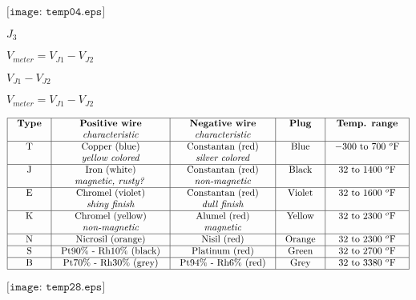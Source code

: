 \documentclass[12pt,a4paper,margin=2cm]{book}
\def\lthtmlcheckvsize{\ifdim\ht\sizebox<\vsize 
  \ifdim\wd\sizebox<\hsize\expandafter\hfill\fi \expandafter\vfill
  \else\expandafter\vss\fi}%
\begin{document}
{\newpage\clearpage
{}%
$\displaystyle \texttt{[image: temp04.eps]}$%
\lthtmlindisplaymathZ
\lthtmlcheckvsize\clearpage}

{\newpage\clearpage
{}%
$ J_3$%
\lthtmlindisplaymathZ
\lthtmlcheckvsize\clearpage}

{\newpage\clearpage
{}%
$\displaystyle V_{meter} = V_{J1} - V_{J2}$%
\lthtmlindisplaymathZ
\lthtmlcheckvsize\clearpage}

{\newpage\clearpage
{}%
$ V_{J1} - V_{J2}$%
\lthtmlindisplaymathZ
\lthtmlcheckvsize\clearpage}

{\newpage\clearpage
{}%
$ V_{meter} = V_{J1} - V_{J2}$%
\lthtmlindisplaymathZ
\lthtmlcheckvsize\clearpage}

{\newpage\clearpage
{}%
$\displaystyle \vbox{\offinterlineskip
\halign{\strut
\vrule \quad\hfil # \  \hfil & 
\vrule \quad\hfil # \  \hfil & 
\vrule \quad\hfil # \  \hfil & 
\vrule \quad\hfil # \  \hfil & 
\vrule \quad\hfil # \  \hfil \vrule \cr
\noalign{\hrule }
\textbf{Type} & \textbf{Positive wire} & \textbf{Negative wire} & \textbf{Plug} & \textbf{Temp. range} \cr
     & \textit{characteristic} & \textit{characteristic} &  & \cr
\noalign{\hrule }
T & Copper (blue) & Constantan (red) & Blue & $-300$ to 700 $^{o}$F \cr
  & \textit{yellow colored} & \textit{silver colored} &  &  \cr
\noalign{\hrule }
J & Iron (white) & Constantan (red) & Black & 32 to 1400 $^{o}$F \cr
  & \textit{magnetic, rusty?} & \textit{non-magnetic} &  &  \cr
\noalign{\hrule }
E & Chromel (violet) & Constantan (red) & Violet & 32 to 1600 $^{o}$F \cr
  & \textit{shiny finish} & \textit{dull finish} &  &  \cr
\noalign{\hrule }
K & Chromel (yellow) & Alumel (red) & Yellow & 32 to 2300 $^{o}$F \cr
  & \textit{non-magnetic} & \textit{magnetic} &  &  \cr
\noalign{\hrule }
N & Nicrosil (orange) & Nisil (red) & Orange & 32 to 2300 $^{o}$F \cr
\noalign{\hrule }
S & Pt90\% - Rh10\% (black) & Platinum (red) & Green & 32 to 2700 $^{o}$F \cr
\noalign{\hrule }
B & Pt70\% - Rh30\% (grey) & Pt94\% - Rh6\% (red) & Grey & 32 to 3380 $^{o}$F \cr
\noalign{\hrule }
} %
}$%
\lthtmlindisplaymathZ
\lthtmlcheckvsize\clearpage}

{\newpage\clearpage
{}%
$\displaystyle \texttt{[image: temp28.eps]}$%
\lthtmlindisplaymathZ
\lthtmlcheckvsize\clearpage}
\end{document}
